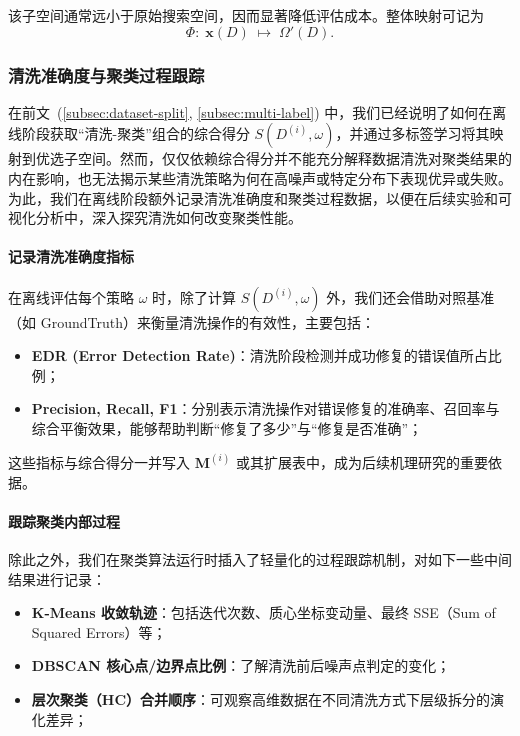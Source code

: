 \documentclass[10pt]{article} %
\numberwithin{equation}{section}
\begin{document}
\noindent 该子空间通常远小于原始搜索空间，因而显著降低评估成本。整体映射可记为  
\begin{equation}\label{eq:mapping-function}
  \Phi:\;
  \mathbf{x}(D)\;\longmapsto\;
  \Omega'(D).
\end{equation}

\subsubsection{清洗准确度与聚类过程跟踪}
\label{subsec:tracking}

在前文~(\ref{subsec:dataset-split}, \ref{subsec:multi-label}) 中，我们已经说明了如何在离线阶段获取“清洗-聚类”组合的综合得分 $S(D^{(i)}, \omega)$，并通过多标签学习将其映射到优选子空间。然而，仅仅依赖综合得分并不能充分解释数据清洗对聚类结果的内在影响，也无法揭示某些清洗策略为何在高噪声或特定分布下表现优异或失败。为此，我们在离线阶段额外记录清洗准确度和聚类过程数据，以便在后续实验和可视化分析中，深入探究清洗如何改变聚类性能。

\paragraph{记录清洗准确度指标}

在离线评估每个策略 $\omega$ 时，除了计算 $S(D^{(i)}, \omega)$ 外，我们还会借助对照基准（如 GroundTruth）来衡量清洗操作的有效性，主要包括：
\begin{itemize}
    \item \textbf{EDR (Error Detection Rate)}\cite{Ni2023}：清洗阶段检测并成功修复的错误值所占比例；
    \item \textbf{Precision, Recall, F1}：分别表示清洗操作对错误修复的准确率、召回率与综合平衡效果，能够帮助判断“修复了多少”与“修复是否准确”；
\end{itemize}
这些指标与综合得分一并写入 $\mathbf{M}^{(i)}$ 或其扩展表中，成为后续机理研究的重要依据。

\paragraph{跟踪聚类内部过程}

除此之外，我们在聚类算法运行时插入了轻量化的过程跟踪机制，对如下一些中间结果进行记录：
\begin{itemize}
    \item \textbf{K-Means 收敛轨迹}：包括迭代次数、质心坐标变动量、最终 SSE（Sum of Squared Errors）等；
    \item \textbf{DBSCAN 核心点/边界点比例}：了解清洗前后噪声点判定的变化；
    \item \textbf{层次聚类（HC）合并顺序}：可观察高维数据在不同清洗方式下层级拆分的演化差异；
\end{itemize}
\end{document}
